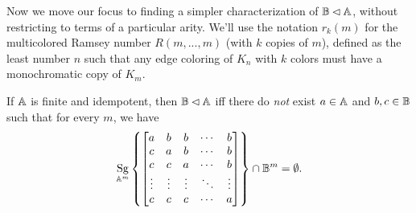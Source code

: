 \documentclass[letterpaper,11pt]{article}
\DeclareMathOperator{\Sg}{Sg}
\begin{document}
Now we move our focus to finding a simpler characterization of $\mathbb{B} \lhd \mathbb{A}$, without restricting to terms of a particular arity. We'll use the notation $r_k(m)$ for the multicolored Ramsey number $R(m,...,m)$ (with $k$ copies of $m$), defined as the least number $n$ such that any edge coloring of $K_n$ with $k$ colors must have a monochromatic copy of $K_m$.

\begin{thm} If $\mathbb{A}$ is finite and idempotent, then $\mathbb{B} \lhd \mathbb{A}$ iff there do \emph{not} exist $a \in \mathbb{A}$ and $b,c \in \mathbb{B}$ such that for every $m$, we have
\[
\Sg_{\bA^m}\left\{\begin{bmatrix} a & b & b & \cdots & b\\ c & a & b & \cdots & b\\ c & c & a & \cdots & b\\ \vdots & \vdots & \vdots & \ddots & \vdots\\ c & c & c & \cdots & a\end{bmatrix}\right\} \cap \bB^m = \emptyset.
\]
\end{thm}
\end{document}

